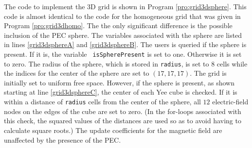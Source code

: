 The code to implement the 3D grid is shown in Program
\ref{pro:grid3dsphere}.  This code is almost identical to the code for
the homogeneous grid that was given in Program \ref{pro:grid3dhomo}.
The the only significant difference is the possible inclusion of the
PEC sphere.  The variables associated with the sphere are listed in
lines \ref{grid3dsphereA} and \ref{grid3dsphereB}.  The users is
queried if the sphere is present.  If it is, the variable {\tt
  isSpherePresent} is set to one.  Otherwise it is set to zero.  The
radius of the sphere, which is stored in {\tt radius}, is set to $8$
cells while the indices for the center of the sphere are set to
$(17,17,17)$.  The grid is initially set to uniform free space.
However, if the sphere is present, as shown starting at line
\ref{grid3dsphereC}, the center of each Yee cube is checked.  If it is
within a distance of {\tt radius} cells from the center of the sphere,
all $12$ electric-field nodes on the edges of the cube are set to
zero.  (In the for-loops associated with this check, the squared
values of the distances are used so as to avoid having to calculate
square roots.)  The update coefficients for the magnetic field are
unaffected by the presence of the PEC.

